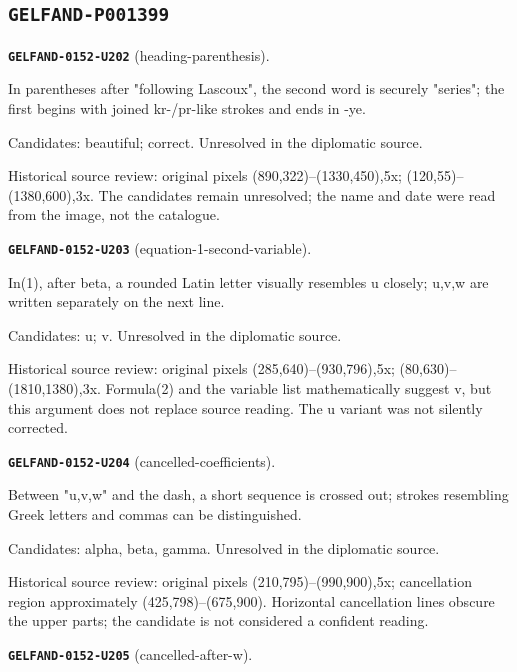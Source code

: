 \subsection*{\texttt{GELFAND-P001399}}
\par\noindent\leavevmode{}\label{GELFAND-0152-U202}\textbf{\texttt{GELFAND-0152-U202}} (heading-parenthesis).\nopagebreak[4]\par
In parentheses after "following Lascoux", the second word is securely "series"; the first begins with joined kr-/pr-like strokes and ends in -ye.\par
Candidates: beautiful; correct. Unresolved in the diplomatic source.\par
Historical source review: original pixels (890,322)–(1330,450),5x; (120,55)–(1380,600),3x. The candidates remain unresolved; the name and date were read from the image, not the catalogue.\par\medskip
\par\noindent\leavevmode{}\label{GELFAND-0152-U203}\textbf{\texttt{GELFAND-0152-U203}} (equation-1-second-variable).\nopagebreak[4]\par
In(1), after beta, a rounded Latin letter visually resembles u closely; u,v,w are written separately on the next line.\par
Candidates: u; v. Unresolved in the diplomatic source.\par
Historical source review: original pixels (285,640)–(930,796),5x; (80,630)–(1810,1380),3x. Formula(2) and the variable list mathematically suggest v, but this argument does not replace source reading. The u variant was not silently corrected.\par\medskip
\par\noindent\leavevmode{}\label{GELFAND-0152-U204}\textbf{\texttt{GELFAND-0152-U204}} (cancelled-coefficients).\nopagebreak[4]\par
Between "u,v,w" and the dash, a short sequence is crossed out; strokes resembling Greek letters and commas can be distinguished.\par
Candidates: alpha, beta, gamma. Unresolved in the diplomatic source.\par
Historical source review: original pixels (210,795)–(990,900),5x; cancellation region approximately (425,798)–(675,900). Horizontal cancellation lines obscure the upper parts; the candidate is not considered a confident reading.\par\medskip
\par\noindent\leavevmode{}\label{GELFAND-0152-U205}\textbf{\texttt{GELFAND-0152-U205}} (cancelled-after-w).\nopagebreak[4]\par
